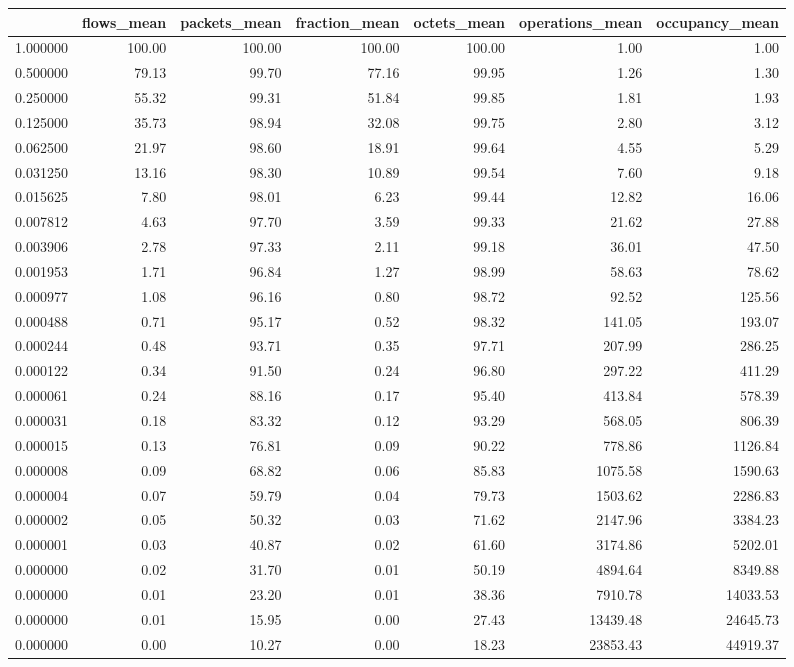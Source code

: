 \begin{tabular}{lrrrrrr}
\toprule
 & flows_mean & packets_mean & fraction_mean & octets_mean & operations_mean & occupancy_mean \\
\midrule
1.000000 & 100.00 & 100.00 & 100.00 & 100.00 & 1.00 & 1.00 \\
0.500000 & 79.13 & 99.70 & 77.16 & 99.95 & 1.26 & 1.30 \\
0.250000 & 55.32 & 99.31 & 51.84 & 99.85 & 1.81 & 1.93 \\
0.125000 & 35.73 & 98.94 & 32.08 & 99.75 & 2.80 & 3.12 \\
0.062500 & 21.97 & 98.60 & 18.91 & 99.64 & 4.55 & 5.29 \\
0.031250 & 13.16 & 98.30 & 10.89 & 99.54 & 7.60 & 9.18 \\
0.015625 & 7.80 & 98.01 & 6.23 & 99.44 & 12.82 & 16.06 \\
0.007812 & 4.63 & 97.70 & 3.59 & 99.33 & 21.62 & 27.88 \\
0.003906 & 2.78 & 97.33 & 2.11 & 99.18 & 36.01 & 47.50 \\
0.001953 & 1.71 & 96.84 & 1.27 & 98.99 & 58.63 & 78.62 \\
0.000977 & 1.08 & 96.16 & 0.80 & 98.72 & 92.52 & 125.56 \\
0.000488 & 0.71 & 95.17 & 0.52 & 98.32 & 141.05 & 193.07 \\
0.000244 & 0.48 & 93.71 & 0.35 & 97.71 & 207.99 & 286.25 \\
0.000122 & 0.34 & 91.50 & 0.24 & 96.80 & 297.22 & 411.29 \\
0.000061 & 0.24 & 88.16 & 0.17 & 95.40 & 413.84 & 578.39 \\
0.000031 & 0.18 & 83.32 & 0.12 & 93.29 & 568.05 & 806.39 \\
0.000015 & 0.13 & 76.81 & 0.09 & 90.22 & 778.86 & 1126.84 \\
0.000008 & 0.09 & 68.82 & 0.06 & 85.83 & 1075.58 & 1590.63 \\
0.000004 & 0.07 & 59.79 & 0.04 & 79.73 & 1503.62 & 2286.83 \\
0.000002 & 0.05 & 50.32 & 0.03 & 71.62 & 2147.96 & 3384.23 \\
0.000001 & 0.03 & 40.87 & 0.02 & 61.60 & 3174.86 & 5202.01 \\
0.000000 & 0.02 & 31.70 & 0.01 & 50.19 & 4894.64 & 8349.88 \\
0.000000 & 0.01 & 23.20 & 0.01 & 38.36 & 7910.78 & 14033.53 \\
0.000000 & 0.01 & 15.95 & 0.00 & 27.43 & 13439.48 & 24645.73 \\
0.000000 & 0.00 & 10.27 & 0.00 & 18.23 & 23853.43 & 44919.37 \\
\bottomrule
\end{tabular}
